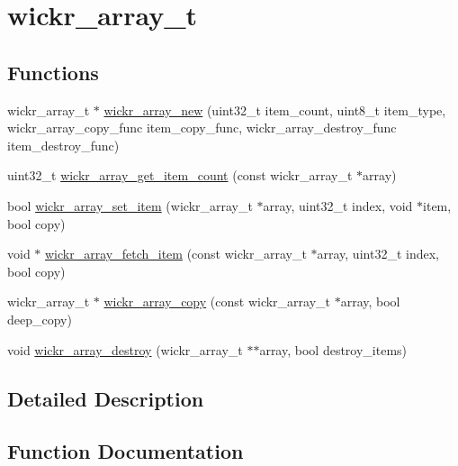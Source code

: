 \hypertarget{group__wickr__array}{}\section{wickr\+\_\+array\+\_\+t}
\label{group__wickr__array}
\subsection*{Functions}
\begin{DoxyCompactItemize}
\item 
wickr\+\_\+array\+\_\+t $\ast$ \mbox{\hyperlink{group__wickr__array_gad5842105c20b42cc4b5b4ffc2a72556b}{wickr\+\_\+array\+\_\+new}} (uint32\+\_\+t item\+\_\+count, uint8\+\_\+t item\+\_\+type, wickr\+\_\+array\+\_\+copy\+\_\+func item\+\_\+copy\+\_\+func, wickr\+\_\+array\+\_\+destroy\+\_\+func item\+\_\+destroy\+\_\+func)
\item 
uint32\+\_\+t \mbox{\hyperlink{group__wickr__array_gafe1191ce494529dbfd5240a84bcba5a2}{wickr\+\_\+array\+\_\+get\+\_\+item\+\_\+count}} (const wickr\+\_\+array\+\_\+t $\ast$array)
\item 
bool \mbox{\hyperlink{group__wickr__array_ga3b3c15b3c6a15f52d20c678b6829ee21}{wickr\+\_\+array\+\_\+set\+\_\+item}} (wickr\+\_\+array\+\_\+t $\ast$array, uint32\+\_\+t index, void $\ast$item, bool copy)
\item 
void $\ast$ \mbox{\hyperlink{group__wickr__array_ga3a6dd3ee6295f6230e2047584a261774}{wickr\+\_\+array\+\_\+fetch\+\_\+item}} (const wickr\+\_\+array\+\_\+t $\ast$array, uint32\+\_\+t index, bool copy)
\item 
wickr\+\_\+array\+\_\+t $\ast$ \mbox{\hyperlink{group__wickr__array_ga1e28a815bd4310985e493b67f66f26c7}{wickr\+\_\+array\+\_\+copy}} (const wickr\+\_\+array\+\_\+t $\ast$array, bool deep\+\_\+copy)
\item 
void \mbox{\hyperlink{group__wickr__array_ga984338e0a278ef1b23aca7330f0bfcc3}{wickr\+\_\+array\+\_\+destroy}} (wickr\+\_\+array\+\_\+t $\ast$$\ast$array, bool destroy\+\_\+items)
\end{DoxyCompactItemize}


\subsection{Detailed Description}


\subsection{Function Documentation}
\mbox{\label{group__wickr__array_ga1e28a815bd4310985e493b67f66f26c7}} 
